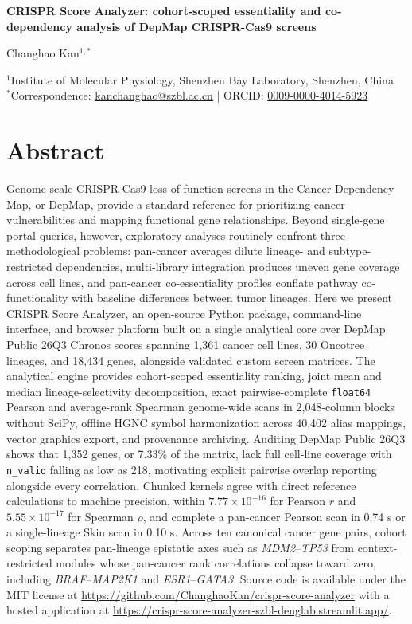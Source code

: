 \documentclass[11pt,a4paper]{article}
\begin{document}
\begin{center}
{\Large\bfseries CRISPR Score Analyzer: cohort-scoped essentiality and co-dependency analysis of DepMap CRISPR-Cas9 screens}

\vspace{0.9em}
{\normalsize Changhao Kan$^{1,*}$}

\vspace{0.35em}
{\small
$^{1}$Institute of Molecular Physiology, Shenzhen Bay Laboratory, Shenzhen, China\\
$^{*}$Correspondence: \href{mailto:kanchanghao@szbl.ac.cn}{kanchanghao@szbl.ac.cn} \;|\; ORCID: \href{https://orcid.org/0009-0000-4014-5923}{0009-0000-4014-5923}
}
\end{center}

\vspace{0.8em}

\section*{Abstract}
Genome-scale CRISPR-Cas9 loss-of-function screens in the Cancer Dependency Map, or DepMap, provide a standard reference for prioritizing cancer vulnerabilities and mapping functional gene relationships. Beyond single-gene portal queries, however, exploratory analyses routinely confront three methodological problems: pan-cancer averages dilute lineage- and subtype-restricted dependencies, multi-library integration produces uneven gene coverage across cell lines, and pan-cancer co-essentiality profiles conflate pathway co-functionality with baseline differences between tumor lineages. Here we present CRISPR Score Analyzer, an open-source Python package, command-line interface, and browser platform built on a single analytical core over DepMap Public 26Q3 Chronos scores spanning 1,361 cancer cell lines, 30 Oncotree lineages, and 18,434 genes, alongside validated custom screen matrices. The analytical engine provides cohort-scoped essentiality ranking, joint mean and median lineage-selectivity decomposition, exact pairwise-complete \texttt{float64} Pearson and average-rank Spearman genome-wide scans in 2,048-column blocks without SciPy, offline HGNC symbol harmonization across 40,402 alias mappings, vector graphics export, and provenance archiving. Auditing DepMap Public 26Q3 shows that 1,352 genes, or 7.33\% of the matrix, lack full cell-line coverage with \texttt{n\_valid} falling as low as 218, motivating explicit pairwise overlap reporting alongside every correlation. Chunked kernels agree with direct reference calculations to machine precision, within $7.77 \times 10^{-16}$ for Pearson $r$ and $5.55 \times 10^{-17}$ for Spearman $\rho$, and complete a pan-cancer Pearson scan in 0.74 s or a single-lineage Skin scan in 0.10 s. Across ten canonical cancer gene pairs, cohort scoping separates pan-lineage epistatic axes such as \textit{MDM2}--\textit{TP53} from context-restricted modules whose pan-cancer rank correlations collapse toward zero, including \textit{BRAF}--\textit{MAP2K1} and \textit{ESR1}--\textit{GATA3}. Source code is available under the MIT license at \url{https://github.com/ChanghaoKan/crispr-score-analyzer} with a hosted application at \url{https://crispr-score-analyzer-szbl-denglab.streamlit.app/}.
\end{document}
